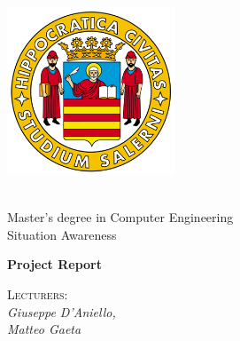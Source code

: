 \begin{titlepage}

    \begin{minipage}[b]{0.3\textwidth}
        \begin{flushleft}
            \includegraphics[width=5cm]{assets/unisa.png}
        \end{flushleft}
    \end{minipage}
    \hfill
    \begin{minipage}[b]{0.7\textwidth}
        \begin{flushright}
                \\ Master's degree in Computer Engineering
                \\ Situation Awareness
        \end{flushright}
    \end{minipage}

    \hrulefill

    \vspace{1cm}

    \begin{LARGE}
        \raggedleft\textbf{Project Report}
    \end{LARGE}

    \begin{large}
         
    \end{large}

    \vspace{1.0cm}

    \begin{minipage}[t]{7cm}
        \flushleft
        \textsc{Lecturers:}\\
        \textit{Giuseppe D'Aniello,}\\ 
        \textit{Matteo Gaeta}\\
    \end{minipage}

    \vspace{0.5cm}
    

\end{titlepage}
